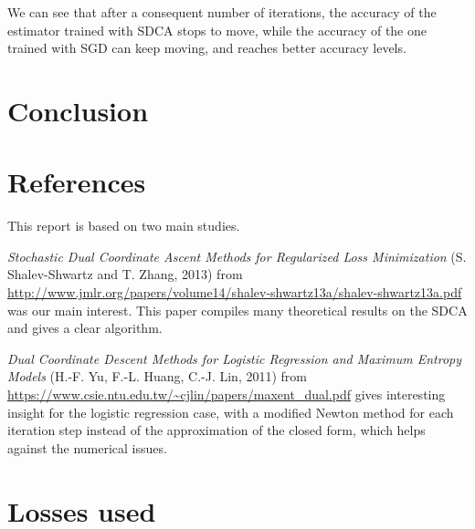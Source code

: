 \documentclass{article}
\begin{document}
We can see that after a consequent number of iterations, the accuracy of the estimator trained with SDCA stops to move, while the accuracy of the one trained with SGD can keep moving, and reaches better accuracy levels.

\section*{Conclusion}




\section*{References}


This report is based on two main studies.

\textit{Stochastic Dual Coordinate Ascent Methods for Regularized Loss Minimization} 
(S. Shalev-Shwartz and T. Zhang, 2013)
from \url{http://www.jmlr.org/papers/volume14/shalev-shwartz13a/shalev-shwartz13a.pdf}
was our main interest. This paper compiles many theoretical results on the SDCA and gives a clear algorithm.

\textit{Dual Coordinate Descent Methods for Logistic Regression and Maximum Entropy Models} 
(H.-F. Yu, F.-L. Huang, C.-J. Lin, 2011) 
from \url{https://www.csie.ntu.edu.tw/~cjlin/papers/maxent_dual.pdf}
gives interesting insight for the logistic regression case, with a modified Newton method 
for each iteration step instead of the approximation of the closed form, which helps against 
the numerical issues.


\newpage
\appendix


\section{Losses used}
\label{appendix-losses}
\end{document}
